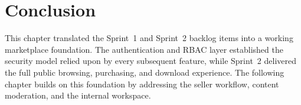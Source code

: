 \section*{Conclusion}
This chapter translated the Sprint~1 and Sprint~2 backlog items into a working marketplace foundation. The authentication and RBAC layer established the security model relied upon by every subsequent feature, while Sprint~2 delivered the full public browsing, purchasing, and download experience. The following chapter builds on this foundation by addressing the seller workflow, content moderation, and the internal workspace.
